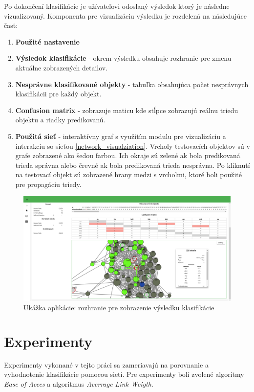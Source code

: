 \documentclass[slovak,master,dept460,male,cpp,cpdeclaration]{diploma}
\begin{document}
Po dokončení klasifikácie je užívateľovi odoslaný výsledok ktorý je následne vizualizovaný. Komponenta pre vizualizáciu výsledku je rozdelená na následujúce čast:
\begin{enumerate}
\item \textbf{Použité nastavenie}
\item \textbf{Výsledok klasifikácie} - okrem výsledku obsahuje rozhranie pre zmenu aktuálne zobrazených detailov.
\item \textbf{Nesprávne klasifikované objekty} - tabuľka obsahujúca počet nesprávnych klasifikácii pre každý objekt.
\item \textbf{Confusion matrix} - zobrazuje maticu kde stĺpce zobrazujú reálnu triedu objektu a riadky predikovanú.
\item \textbf{Použitá sieť} - interaktívny graf s využitím modulu pre vizualizáciu a interakciu so sieťou  \ref{network_visualziation}. Vrcholy testovacích objektov sú v grafe zobrazené ako šedou farbou. Ich okraje sú zelené ak bola predikovaná trieda správna alebo črevné ak bola predikovaná trieda nesprávna. Po kliknutí na testovací objekt sú zobrazené hrany medzi s vrcholmi, ktoré boli použité pre propagáciu triedy.
\end{enumerate}
\begin{figure}[H]
\centering
\includegraphics[width=\textwidth]{classification_result.PNG}
\caption{Ukážka aplikácie: rozhranie pre zobrazenie výsledku klasifikácie}
\end{figure} 
        
\section{Experimenty}
Experimenty vykonané v tejto práci sa zameriavajú na porovnanie a vyhodnotenie klasifikácie pomocou sietí. Pre experimenty bolí zvolené algoritmy \textit{Ease of Acces} a algoritmus \textit{Averrage Link Weigth}.
\end{document}
